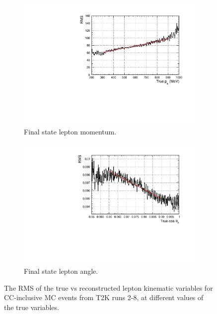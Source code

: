 \begin{figure}[t]
\centering
\begin{subfigure}{.5\textwidth}
  \centering
  \includegraphics[width=0.95\linewidth]{figs/momres1d}
  \caption{Final state lepton momentum.}
  \label{fig:momres1d}
\end{subfigure}%
\begin{subfigure}{.5\textwidth}
  \centering
  \includegraphics[width=0.95\linewidth]{figs/angres1d}
  \caption{Final state lepton angle.}
  \label{fig:angres1d}
\end{subfigure}
\caption{The RMS of the true vs reconstructed lepton kinematic variables for CC-inclusive MC events from T2K runs 2-8, at different values of the true variables.}
\label{fig:res1d}
\end{figure}

